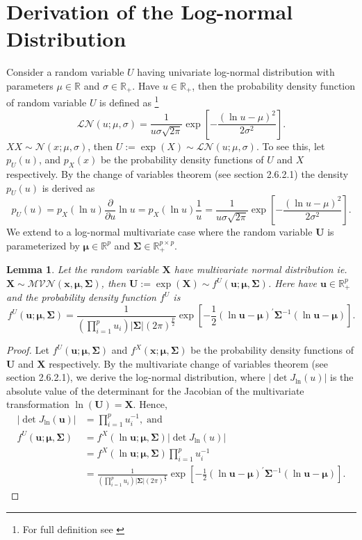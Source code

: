 \documentclass[11pt,letterpaper]{article}
\numberwithin{equation}{section}
\numberwithin{equation}{section}
\numberwithin{equation}{section}
\newtheorem{lemma}[theorem]{Lemma}
\begin{document}
\appendix
\section{Derivation of the Log-normal Distribution }
Consider a random variable $U$ having univariate log-normal distribution with parameters $\mu \in \mathbb{R}$ and $\sigma \in \mathbb{R}_+ $. Have $u \in \mathbb{R}_+$, then the probability density function of random variable $U$ is defined as \footnote{For full definition see \cite{johnson1995continuous}}
$$\mathcal{LN}(u; \mu, \sigma) = \frac{1}{u\sigma\sqrt{2\pi}}\exp\left[-\frac{(\ln u - \mu)^2}{2\sigma^2}	\right].$$
$X$$ X \sim \mathcal{N}(x; \mu, \sigma) $, then $U := \exp{(X)}\sim \mathcal{LN}(u; \mu, \sigma) $.
To see this, let $p_U(u)$, and $ p_X(x) $ be the probability density functions of $U$ and $X$ respectively. By the change of variables theorem (see \cite{murphy2012machine} section 2.6.2.1) the density $p_U(u)$ is derived as
$$p_U(u) = p_X(\ln u )\frac{\partial}{\partial u} \ln u  =  p_X(\ln u ) \frac{1}{u} =  \frac{1}{u\sigma\sqrt{2\pi}}\exp\left[-\frac{(\ln u - \mu)^2}{2\sigma^2}	\right].$$\newline
 We extend to a log-normal multivariate case where the random variable $\bm{U} $ is parameterized by $ \bm{\mu} \in \mathbb{R}^p$ and $\bm{\Sigma} \in  \mathbb{R}_{+}^{p \times p} \label{changeVarUni} $.
\begin{lemma}
Let the random variable $\bm{X}$ have multivariate normal distribution ie. $\bm{X} \sim \mathcal{MVN}(\bm{x}, \bm{\mu},\bm{\Sigma}) $, then $\bm{U} := \exp(\bm{X} ) \sim  f^U(\bm{u}; \bm{\mu } , \bm{\Sigma} )$. Here
have $\bm{u} \in \mathbb{R}_{+}^p $ and the probability density function $f^U$ is
$$ f^U(\bm{u}; \bm{\mu } , \bm{\Sigma} )= \frac{1}{(\prod_{i=1}^{p}u_{i})| \bm{\Sigma} |(2 \pi)^{\frac{p}{2}}}   \exp\left[-\frac{1}{2}(\ln \bm{u} -\bm{\mu})^{'}  \bm{\Sigma}^{-1}(\ln \bm{u} -\bm{\mu})\right].  $$
\end{lemma}
\begin{proof}
Let $f^U(\bm{u}; \bm{\mu},\bm{\Sigma})$ and $f^X(\bm{x}; \bm{\mu},\bm{\Sigma})$ be the probability density functions of $\bm{U}$ and $\bm{X}$ respectively. By the multivariate change of variables theorem (see \cite{murphy2012machine} section 2.6.2.1), we derive the log-normal distribution, where $ | \det J_{\ln} (u) | $ is the absolute value of the determinant for the Jacobian of the multivariate transformation $\ln(\bm{U}) = \bm{X} $. Hence,
\begin{align*}
 | \det J_{\ln} (\bm{u}) | & = \prod_{i=1}^p u_i^{-1}, \; \text{and} \; \\
   f^U(\bm{u}; \bm{\mu},\bm{\Sigma})  & =  f^X(\ln \bm{u}; \bm{\mu},\bm{\Sigma})  | \det J_{\ln} (u) | \\
  & = f^X(\ln \bm{u}; \bm{\mu},\bm{\Sigma})\prod_{i=1}^p u_i^{-1} \\
  & =  \frac{1}{(\prod_{i=1}^{p}u_{i})| \bm{\Sigma} |(2 \pi)^{\frac{p}{2}}}   \exp\left[-\frac{1}{2}(\ln \bm{u} -\bm{\mu})^{'}  \bm{\Sigma}^{-1}(\ln \bm{u} -\bm{\mu})\right].
  \end{align*}
\end{proof}
\end{document}

